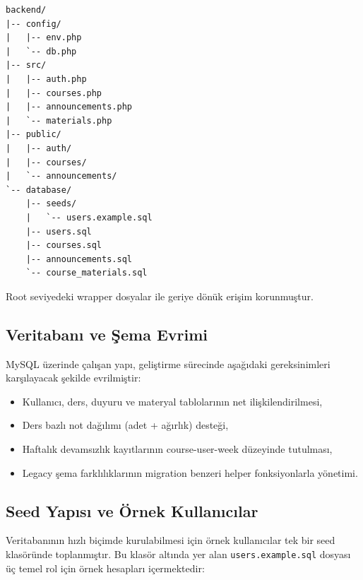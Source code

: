\documentclass[12pt,a4paper]{article}
\begin{document}
\begin{lstlisting}[basicstyle=\ttfamily\small]
backend/
|-- config/
|   |-- env.php
|   `-- db.php
|-- src/
|   |-- auth.php
|   |-- courses.php
|   |-- announcements.php
|   `-- materials.php
|-- public/
|   |-- auth/
|   |-- courses/
|   `-- announcements/
`-- database/
    |-- seeds/
    |   `-- users.example.sql
    |-- users.sql
    |-- courses.sql
    |-- announcements.sql
    `-- course_materials.sql
\end{lstlisting}

Root seviyedeki wrapper dosyalar ile geriye dönük erişim korunmuştur.

\subsection{Veritabanı ve Şema Evrimi}
MySQL üzerinde çalışan yapı, geliştirme sürecinde aşağıdaki gereksinimleri karşılayacak şekilde evrilmiştir:

\begin{itemize}[leftmargin=*]
    \item Kullanıcı, ders, duyuru ve materyal tablolarının net ilişkilendirilmesi,
    \item Ders bazlı not dağılımı (adet + ağırlık) desteği,
    \item Haftalık devamsızlık kayıtlarının course-user-week düzeyinde tutulması,
    \item Legacy şema farklılıklarının migration benzeri helper fonksiyonlarla yönetimi.
\end{itemize}

\subsection{Seed Yapısı ve Örnek Kullanıcılar}
Veritabanının hızlı biçimde kurulabilmesi için örnek kullanıcılar tek bir seed klasöründe toplanmıştır. Bu klasör altında yer alan \texttt{users.example.sql} dosyası üç temel rol için örnek hesapları içermektedir:

\begin{table}[H]
\centering
{}
\end{table}
\end{document}
